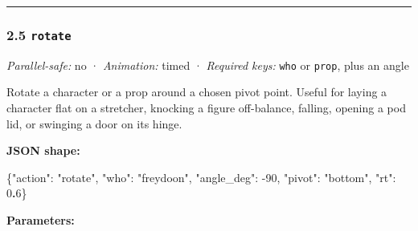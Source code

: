 \documentclass[
  12pt,
  letterpaper,
]{book}
\newenvironment{Shaded}{}{}
\newcommand{\DataTypeTok}[1]{\textcolor[rgb]{0.56,0.13,0.00}{#1}}
\newcommand{\DecValTok}[1]{\textcolor[rgb]{0.25,0.63,0.44}{#1}}
\newcommand{\ErrorTok}[1]{\textcolor[rgb]{1.00,0.00,0.00}{\textbf{#1}}}
\newcommand{\FunctionTok}[1]{\textcolor[rgb]{0.02,0.16,0.49}{#1}}
\newcommand{\StringTok}[1]{\textcolor[rgb]{0.25,0.44,0.63}{#1}}
\begin{document}
\begin{center}\rule{0.5\linewidth}{0.5pt}\end{center}

\subsubsection{\texorpdfstring{2.5
\texttt{rotate}}{2.5 rotate}}\label{rotate}

\emph{Parallel-safe:} no · \emph{Animation:} timed · \emph{Required
keys:} \texttt{who} or \texttt{prop}, plus an angle

Rotate a character or a prop around a chosen pivot point. Useful for
laying a character flat on a stretcher, knocking a figure off-balance,
falling, opening a pod lid, or swinging a door on its hinge.

\textbf{JSON shape:}

\begin{Shaded}
\begin{Highlighting}[]
\FunctionTok{\{}\DataTypeTok{"action"}\FunctionTok{:} \StringTok{"rotate"}\FunctionTok{,} \DataTypeTok{"who"}\FunctionTok{:} \StringTok{"freydoon"}\FunctionTok{,}
 \DataTypeTok{"angle\_deg"}\FunctionTok{:} \DecValTok{{-}90}\FunctionTok{,} \DataTypeTok{"pivot"}\FunctionTok{:} \StringTok{"bottom"}\FunctionTok{,} \DataTypeTok{"rt"}\FunctionTok{:} \DecValTok{0}\ErrorTok{.}\DecValTok{6}\FunctionTok{\}}
\end{Highlighting}
\end{Shaded}

\textbf{Parameters:}
\end{document}
